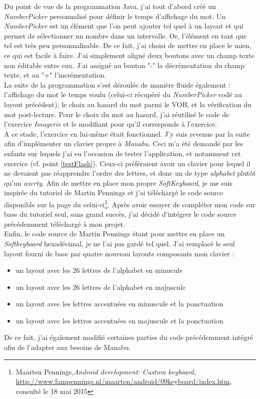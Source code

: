 Du point de vue de la programmation Java, j'ai tout d'abord créé un \textit{NumberPicker} personnalisé pour définir le temps d'affichage du mot. Un \textit{NumberPicker} est un élément que l'on peut ajouter tel quel à un layout et qui permet de sélectionner un nombre dans un intervalle. Or, l'élément en tant que tel est très peu personnalisable. De ce fait, j'ai choisi de mettre en place le mien, ce qui est facile à faire. J'ai simplement aligné deux boutons avec un champ texte non éditable entre eux. J'ai assigné au bouton "-" la décrémentation du champ texte, et au "+" l'incrémentation.\\

La suite de la programmation s'est déroulée de manière fluide également : l'affichage du mot le temps voulu (celui-ci récupéré du \textit{NumberPicker} codé au layout précédent), le choix au hasard du mot parmi le VOB, et la vérification du mot post-lecture. Pour le choix du mot au hasard, j'ai réutilisé le code de l'exercice \textit{Imagerie} et le modifiant pour qu'il corresponde à l'exercice.\\

A ce stade, l'exercice en lui-même était fonctionnel. J'y suis revenue par la suite afin d'implémenter un clavier propre à \textit{Manabu}. Ceci m'a été demandé par les enfants sur lequels j'ai eu l'occasion de tester l'application, et notamment cet exercice (cf. point \ref{testFlash}). Ceux-ci préféraient avoir un clavier pour lequel il ne devaient pas réapprendre l'ordre des lettres, et donc un de type \textit{alphabet} plutôt qu'un \textit{azerty}. Afin de mettre en place mon propre \textit{SoftKeyboard}, je me suis inspirée du tutoriel de Martin Pennings et j'ai téléchargé le code source disponible sur la page du celui-ci\footnote{Maarten Pennings,\textit{Android development: Custom keyboard}, \url{http://www.fampennings.nl/maarten/android/09keyboard/index.htm}, consulté le 18 mai 2015}. Après avoir essayer de compléter mon code sur base du tutoriel seul, sans grand succès, j'ai décidé d'intégrer le code source précédemment téléchargé à mon projet.\\

Enfin, le code source de Martin Pennings étant pour mettre en place un \textit{Softkeyboard} hexadécimal, je ne l'ai pas gardé tel quel. J'ai remplacé le seul layout fourni de base par quatre nouveau layouts composants mon clavier :
\begin{itemize}
\item un layout avec les 26 lettres de l'alphabet en minucule
\item un layout avec les 26 lettres de l'alphabet en majuscule
\item un layout avec les lettres accentuées en minuscule et la ponctuation
\item un layout avec les lettres accentuées en majuscule et la ponctuation
\end{itemize}
De ce fait, j'ai également modifié certaines parties du code précédemment intégré afin de l'adapter aux besoins de Manabu.\\

